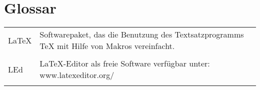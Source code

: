 %
%
%
\chapter{Glossar}
\label{cha:glossar}


\begin{tabular}{p{3cm} p{12cm}}

LaTeX & Softwarepaket, das die Benutzung des Textsatzprogramms TeX mit Hilfe von Makros vereinfacht.\\
\\
LEd & LaTeX-Editor als freie Software verfügbar unter: www.latexeditor.org/ \\
\\
\end{tabular}
